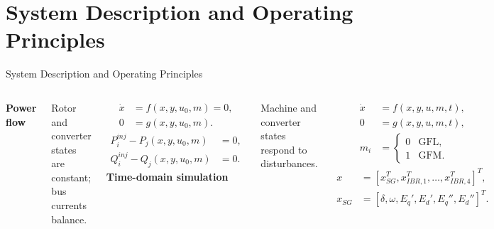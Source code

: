 \documentclass{beamer}
\begin{document}
\section{System Description and Operating Principles}
\begin{frame}{System Description and Operating Principles}
\footnotesize
\begin{columns}[t,onlytextwidth]
\textbf{Power flow}\par
Rotor and converter states are constant; bus currents balance.\par
\begin{align}
\dot x&=f(x,y,u_0,m)=0,\\
0&=g(x,y,u_0,m).
\end{align}
{\scriptsize
\begin{align}
P^{inj}_i-P_j(x,y,u_0,m)&=0,\\
Q^{inj}_i-Q_j(x,y,u_0,m)&=0.
\end{align}}
\textbf{Time-domain simulation}\par
Machine and converter states respond to disturbances.\par
\begin{align}
\dot x&=f(x,y,u,m,t),\\
0&=g(x,y,u,m,t),\\
m_i&=\begin{cases}0&\text{GFL},\\1&\text{GFM}.\end{cases}
\end{align}
\begin{align}
x&=[x_{SG}^{T},x_{IBR,1}^{T},\ldots,x_{IBR,4}^{T}]^T,\\
x_{SG}&=[\delta,\omega,E_q',E_d',E_q'',E_d'']^T.
\end{align}
\end{columns}
\end{frame}
\end{document}

